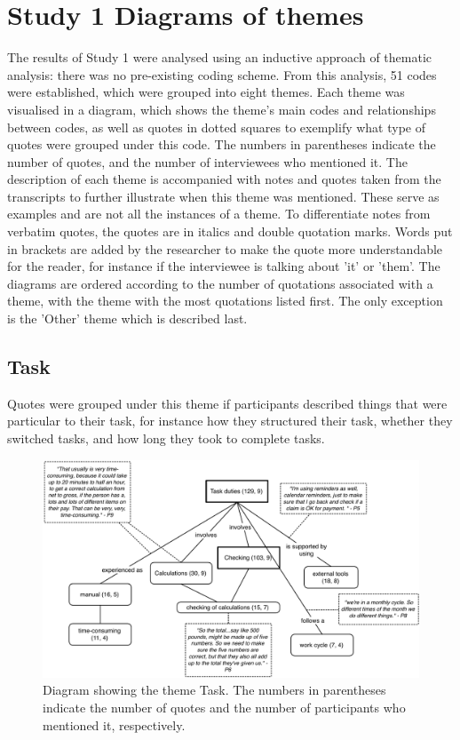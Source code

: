 \chapter{Study 1 Diagrams of themes}\label{ch:S1_Diagrams}
The results of Study 1 were analysed using an inductive approach of thematic analysis: there was no pre-existing coding scheme. From this analysis, 51 codes were established, which were grouped into eight themes. Each theme was visualised in a diagram, which shows the theme's main codes and relationships between codes, as well as quotes in dotted squares to exemplify what type of quotes were grouped under this code. The numbers in parentheses indicate the number of quotes, and the number of interviewees who mentioned it. 
The description of each theme is accompanied with notes and quotes taken from the transcripts to further illustrate when this theme was mentioned. These serve as examples and are not all the instances of a theme. To differentiate notes from verbatim quotes, the quotes are in italics and double quotation marks. Words put in brackets are added by the researcher to make the quote more understandable for the reader, for instance if the interviewee is talking about 'it' or 'them'. The diagrams are ordered according to the number of quotations associated with a theme, with the theme with the most quotations listed first. The only exception is the 'Other' theme which is described last.

\newpage

\section{Task}
Quotes were grouped under this theme if participants described things that were particular to their task, for instance how they structured their task, whether they switched tasks, and how long they took to complete tasks.

\begin{figure}[!ht]
\centering
\includegraphics[width=\textwidth]{images/ch12/Task.pdf}
\caption[Study 1 Task diagram]{Diagram showing the theme Task. The numbers in parentheses indicate the number of quotes and the number of participants who mentioned it, respectively.}
\vspace{-9pt}
\label{fig:ch3_task}
\end{figure}

